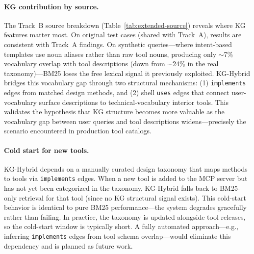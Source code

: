 \documentclass[11pt,a4paper]{article}
\begin{document}
\paragraph{KG contribution by source.}
The Track~B source breakdown (Table~\ref{tab:extended-source}) reveals where KG features matter most. On original test cases (shared with Track~A), results are consistent with Track~A findings. On synthetic queries---where intent-based templates use noun aliases rather than raw tool nouns, producing only $\sim$7\% vocabulary overlap with tool descriptions (down from $\sim$24\% in the real taxonomy)---BM25 loses the free lexical signal it previously exploited. KG-Hybrid bridges this vocabulary gap through two structural mechanisms: (1) \texttt{implements} edges from matched design methods, and (2) shell \texttt{uses} edges that connect user-vocabulary surface descriptions to technical-vocabulary interior tools. This validates the hypothesis that KG structure becomes more valuable as the vocabulary gap between user queries and tool descriptions widens---precisely the scenario encountered in production tool catalogs.

\paragraph{Cold start for new tools.}
KG-Hybrid depends on a manually curated design taxonomy that maps methods to tools via \texttt{implements} edges. When a new tool is added to the MCP server but has not yet been categorized in the taxonomy, KG-Hybrid falls back to BM25-only retrieval for that tool (since no KG structural signal exists). This cold-start behavior is identical to pure BM25 performance---the system degrades gracefully rather than failing. In practice, the taxonomy is updated alongside tool releases, so the cold-start window is typically short. A fully automated approach---e.g., inferring \texttt{implements} edges from tool schema overlap---would eliminate this dependency and is planned as future work.
\end{document}
